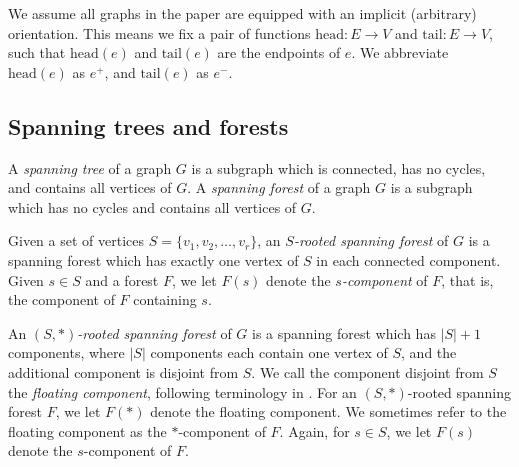 \documentclass[12pt]{amsart}
\theoremstyle{definition}
\DeclareMathOperator{\conv}{conv}
\newcommand\farbod[1]{\footnote{[\textcolor{orange}{(Farbod)} \textcolor{blue}{#1}]}}
\begin{document}
We assume all graphs in the paper are equipped with an implicit (arbitrary) orientation. This means we fix a pair of functions $\mathrm{head}\colon E \to V$ and $\mathrm{tail}\colon E \to V$, such that $\mathrm{head}(e)$ and $\mathrm{tail}(e)$ are the endpoints of $e$. We abbreviate $\mathrm{head}(e)$ as $e^+$, and $\mathrm{tail}(e)$ as $e^-$.







\subsection{Spanning trees and forests}

A {\em spanning tree} of a graph $G$ is a subgraph which 
is connected, has no cycles,
and contains all vertices of $G$.
A {\em spanning forest} of a graph $G$ is a subgraph which 
has no cycles
and  contains all vertices of $G$. 



Given a set of vertices $S = \{v_1, v_2, \ldots, v_r\}$,
an {\em $S$-rooted spanning forest} of $G$ 
is a spanning forest which has exactly one vertex of $S$ in each connected component.
Given $s \in S$ and a forest $F$, we let $F(s)$ denote the {\em $s$-component} of $F$, that is, the component of $F$ containing $s$.

An {\em $(S,*)$-rooted spanning forest} of $G$ is a spanning forest which has $|S|+1$ components, where $|S|$ components each contain one vertex of $S$, and the additional component is disjoint from $S$.
We call the component disjoint from $S$ the {\em floating component}, following terminology in \cite{kassel-kenyon-wu}.
For an $(S,*)$-rooted spanning forest $F$, we let $F(*)$ denote the floating component. We sometimes refer to the floating component as the $*$-component of $F$. Again, for $s \in S$, we let $F(s)$ denote the $s$-component of $F$.
\end{document}
